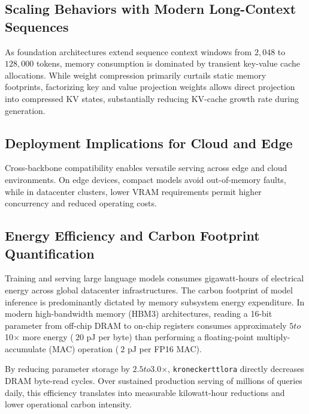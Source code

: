 \subsection{Scaling Behaviors with Modern Long-Context Sequences}
As foundation architectures extend sequence context windows from $2{,}048$ to $128{,}000$ tokens, memory consumption is dominated by transient key-value cache allocations. While weight compression primarily curtails static memory footprints, factorizing key and value projection weights allows direct projection into compressed KV states, substantially reducing KV-cache growth rate during generation.

\subsection{Deployment Implications for Cloud and Edge}
Cross-backbone compatibility enables versatile serving across edge and cloud environments. On edge devices, compact models avoid out-of-memory faults, while in datacenter clusters, lower VRAM requirements permit higher concurrency and reduced operating costs.

\subsection{Energy Efficiency and Carbon Footprint Quantification}
Training and serving large language models consumes gigawatt-hours of electrical energy across global datacenter infrastructures. The carbon footprint of model inference is predominantly dictated by memory subsystem energy expenditure. In modern high-bandwidth memory (HBM3) architectures, reading a 16-bit parameter from off-chip DRAM to on-chip registers consumes approximately $5$\times$ to $10$\times$ more energy ($~20$ pJ per byte) than performing a floating-point multiply-accumulate (MAC) operation ($~2$ pJ per FP16 MAC).

By reducing parameter storage by $2.5$\times$ to $3.0$\times$, \texttt{kroneckerttlora} directly decreases DRAM byte-read cycles. Over sustained production serving of millions of queries daily, this efficiency translates into measurable kilowatt-hour reductions and lower operational carbon intensity.
